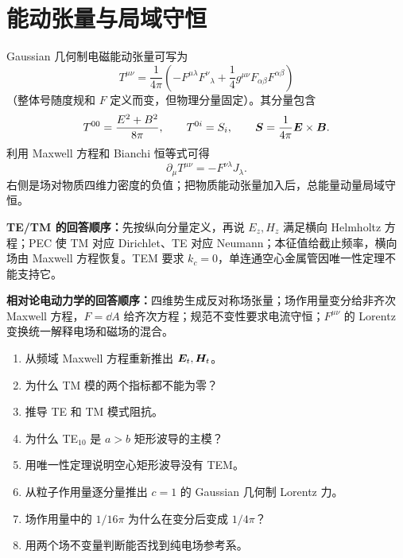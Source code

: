 \section{能动张量与局域守恒}
Gaussian 几何制电磁能动张量可写为
\[
T^{\mu\nu}=\frac1{4\pi}
\left(-F^{\mu\lambda}F^\nu{}_\lambda
+\frac14g^{\mu\nu}F_{\alpha\beta}F^{\alpha\beta}\right)
\]
（整体号随度规和 $F$ 定义而变，但物理分量固定）。其分量包含
\[
T^{00}=\frac{E^2+B^2}{8\pi},\qquad
T^{0i}=S_i,\qquad
\bm{S}=\frac1{4\pi}\bm{E}\times\bm{B}.
\]
利用 Maxwell 方程和 Bianchi 恒等式可得
\[
\boxed{\partial_\mu T^{\mu\nu}
=-F^{\nu\lambda}J_\lambda}.
\]
右侧是场对物质四维力密度的负值；把物质能动张量加入后，总能量动量局域守恒。

\begin{interviewbox}
\textbf{TE/TM 的回答顺序：}先按纵向分量定义，再说 $E_z,H_z$ 满足横向 Helmholtz 方程；PEC 使 TM 对应 Dirichlet、TE 对应 Neumann；本征值给截止频率，横向场由 Maxwell 方程恢复。TEM 要求 $k_c=0$，单连通空心金属管因唯一性定理不能支持它。

\textbf{相对论电动力学的回答顺序：}四维势生成反对称场张量；场作用量变分给非齐次 Maxwell 方程，$F=\dd A$ 给齐次方程；规范不变性要求电流守恒；$F^{\mu\nu}$ 的 Lorentz 变换统一解释电场和磁场的混合。
\end{interviewbox}

\begin{selftestbox}
\begin{enumerate}
\item 从频域 Maxwell 方程重新推出 $\bm{E}_t,\bm{H}_t$。
\item 为什么 TM 模的两个指标都不能为零？
\item 推导 TE 和 TM 模式阻抗。
\item 为什么 TE$_{10}$ 是 $a>b$ 矩形波导的主模？
\item 用唯一性定理说明空心矩形波导没有 TEM。
\item 从粒子作用量逐分量推出 $c=1$ 的 Gaussian 几何制 Lorentz 力。
\item 场作用量中的 $1/16\pi$ 为什么在变分后变成 $1/4\pi$？
\item 用两个场不变量判断能否找到纯电场参考系。
\end{enumerate}
\end{selftestbox}
